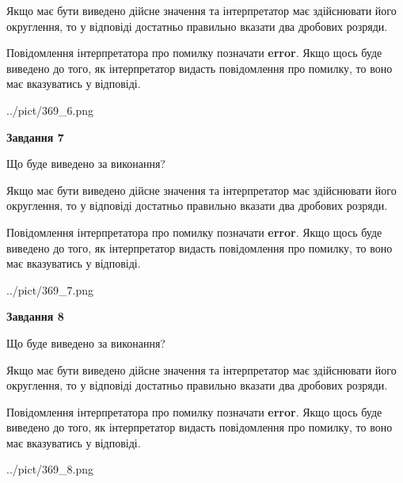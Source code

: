 \documentclass[12pt, ukrainian]{article}
\begin{document}
{\begin {Large}
Якщо має бути виведено дійсне значення та інтерпретатор має здійснювати його округлення, 
то у відповіді достатньо правильно вказати два дробових розряди.

Повідомлення інтерпретатора про помилку позначати \textbf{error}.
Якщо щось буде виведено до того, як інтерпретатор видасть повідомлення про помилку, 
то воно має вказуватись у відповіді. \par

\begin{center}
	{../pict/369_6.png}
\end{center}
\newpage

{\begin {center}\textbf{Завдання 7}\end {center}}\par
Що буде виведено за виконання? \par

Якщо має бути виведено дійсне значення та інтерпретатор має здійснювати його округлення, 
то у відповіді достатньо правильно вказати два дробових розряди.

Повідомлення інтерпретатора про помилку позначати \textbf{error}.
Якщо щось буде виведено до того, як інтерпретатор видасть повідомлення про помилку, 
то воно має вказуватись у відповіді. \par

\begin{center}
	{../pict/369_7.png}
\end{center}
\newpage

{\begin {center}\textbf{Завдання 8}\end {center}}\par
Що буде виведено за виконання? \par

Якщо має бути виведено дійсне значення та інтерпретатор має здійснювати його округлення, 
то у відповіді достатньо правильно вказати два дробових розряди.

Повідомлення інтерпретатора про помилку позначати \textbf{error}.
Якщо щось буде виведено до того, як інтерпретатор видасть повідомлення про помилку, 
то воно має вказуватись у відповіді. \par

\begin{center}
	{../pict/369_8.png}
\end{center}
\newpage


\end{Large}}
\end{document}

